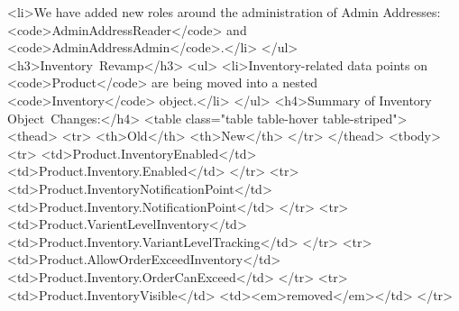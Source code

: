 \documentclass{memoir}%
\begin{document}
<li>We have added new roles around the administration of Admin Addresses: <code>AdminAddressReader</code> and <code>AdminAddressAdmin</code>.</li>\newline%
</ul>\newline%
<h3>Inventory~Revamp</h3>\newline%
<ul>\newline%
<li>Inventory{-}related data points on <code>Product</code> are being moved into a nested <code>Inventory</code> object.</li>\newline%
</ul>\newline%
<h4>Summary of Inventory Object~Changes:</h4>\newline%
<table class="table table{-}hover table{-}striped">\newline%
<thead>\newline%
<tr>\newline%
<th>Old</th>\newline%
<th>New</th>\newline%
</tr>\newline%
</thead>\newline%
<tbody>\newline%
<tr>\newline%
<td>Product.InventoryEnabled</td>\newline%
<td>Product.Inventory.Enabled</td>\newline%
</tr>\newline%
<tr>\newline%
<td>Product.InventoryNotificationPoint</td>\newline%
<td>Product.Inventory.NotificationPoint</td>\newline%
</tr>\newline%
<tr>\newline%
<td>Product.VarientLevelInventory</td>\newline%
<td>Product.Inventory.VariantLevelTracking</td>\newline%
</tr>\newline%
<tr>\newline%
<td>Product.AllowOrderExceedInventory</td>\newline%
<td>Product.Inventory.OrderCanExceed</td>\newline%
</tr>\newline%
<tr>\newline%
<td>Product.InventoryVisible</td>\newline%
<td><em>removed</em></td>\newline%
</tr>\newline%
\end{document}
